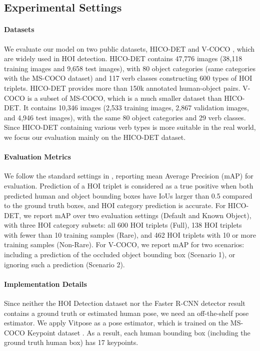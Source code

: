 \documentclass[10pt,twocolumn,letterpaper]{article}
\begin{document}
\subsection{Experimental Settings}
\label{sec:4-1}
\paragraph{Datasets}
We evaluate our model on two public datasets, HICO-DET \cite{chao:wacv2018} and V-COCO \cite{gupta2015visual}, which are widely used in HOI detection. HICO-DET contains 47,776 images (38,118 training images and 9,658 test images), with 80 object categories (same categories with the MS-COCO \cite{lin2014microsoft} dataset) and 117 verb classes constructing 600 types of HOI triplets. HICO-DET provides more than 150k annotated human-object pairs. V-COCO is a subset of MS-COCO, which is a much smaller dataset than HICO-DET. It contains 10,346 images (2,533 training images, 2,867 validation images, and 4,946 test images), with the same 80 object categories and 29 verb classes. Since HICO-DET containing various verb types is more suitable in the real world, we focus our evaluation mainly on the HICO-DET dataset.

\paragraph{Evaluation Metrics}
We follow the standard settings in \cite{gao2018ican}, reporting mean Average Precision (mAP) for evaluation. Prediction of a HOI triplet is considered as a true positive when both predicted human and object bounding boxes have IoUs larger than 0.5 compared to the ground truth boxes, and HOI category prediction is accurate. For HICO-DET, we report mAP over two evaluation settings (Default and Known Object), with three HOI category subsets: all 600 HOI triplets (Full), 138 HOI triplets with fewer than 10 training samples (Rare), and 462 HOI triplets with 10 or more training samples (Non-Rare). For V-COCO, we report mAP for two scenarios: including a prediction of the occluded object bounding box (Scenario 1), or ignoring such a prediction (Scenario 2). 

\paragraph{Implementation Details}
Since neither the HOI Detection dataset nor the Faster R-CNN detector result contains a ground truth or estimated human pose, we need an off-the-shelf pose estimator. We apply Vitpose \cite{xu2022vitpose} as a pose estimator, which is trained on the MS-COCO Keypoint dataset \cite{lin2014microsoft}. As a result, each human bounding box (including the ground truth human box) has 17 keypoints. 
\end{document}
